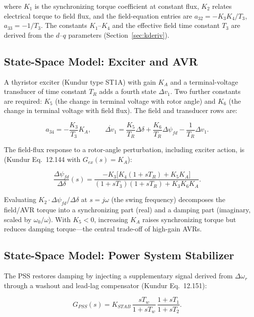 \documentclass[12pt,a4paper]{article}
\newcommand{\dwr}{\Delta\omega_r}
\newcommand{\ddel}{\Delta\delta}
\newcommand{\dpsifd}{\Delta\psi_{fd}}
\begin{document}
where $K_1$ is the synchronizing torque coefficient at constant flux, $K_2$
relates electrical torque to field flux, and the field-equation entries are
$a_{32} = -K_3 K_4 / T_3$, $a_{33} = -1/T_3$. The constants $K_1$--$K_4$ and the
effective field time constant $T_3$ are derived from the $d$--$q$ parameters
(Section~\ref{sec:kderiv}).

\subsection{State-Space Model: Exciter and AVR}

A thyristor exciter (Kundur type ST1A) with gain $K_A$ and a terminal-voltage
transducer of time constant $T_R$ adds a fourth state $\Delta v_1$. Two further
constants are required: $K_5$ (the change in terminal voltage with rotor angle)
and $K_6$ (the change in terminal voltage with field flux). The field and
transducer rows are:

\begin{equation}
a_{34} = -\frac{K_3}{T_3}K_A,
\qquad
\dot{\Delta v_1} = \frac{K_5}{T_R}\ddel + \frac{K_6}{T_R}\dpsifd
- \frac{1}{T_R}\Delta v_1.
\end{equation}

The field-flux response to a rotor-angle perturbation, including exciter action,
is (Kundur Eq.~12.144 with $G_{ex}(s)=K_A$):

\begin{equation}
\frac{\dpsifd}{\ddel}(s) =
\frac{-K_3\bigl[K_4(1+sT_R) + K_5 K_A\bigr]}
     {(1+sT_3)(1+sT_R) + K_3 K_6 K_A}.
\label{eq:psifd}
\end{equation}

Evaluating $K_2 \cdot \dpsifd/\ddel$ at $s = j\omega$ (the swing frequency)
decomposes the field/AVR torque into a synchronizing part (real) and a damping
part (imaginary, scaled by $\omega_0/\omega$). With $K_5<0$, increasing $K_A$
raises synchronizing torque but reduces damping torque---the central trade-off
of high-gain AVRs.

\subsection{State-Space Model: Power System Stabilizer}

The PSS restores damping by injecting a supplementary signal derived from
$\dwr$ through a washout and lead-lag compensator (Kundur Eq.~12.151):

\begin{equation}
G_{PSS}(s) = K_{STAB}\,
\frac{sT_w}{1+sT_w}\,
\frac{1+sT_1}{1+sT_2}.
\end{equation}
\end{document}
